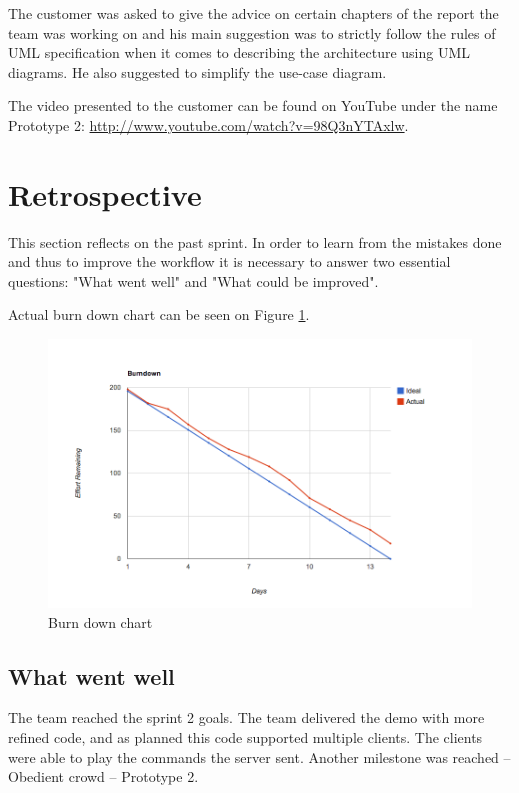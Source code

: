 The customer was asked to give the advice on certain chapters of the report the team was working on and his main suggestion was to strictly follow the rules of UML specification when it comes to describing the architecture using UML diagrams. He also suggested to simplify the use-case diagram.

The video presented to the customer can be found on YouTube under the name Prototype 2: \url{http://www.youtube.com/watch?v=98Q3nYTAxlw}.




\section{Retrospective}
This section reflects on the past sprint. In order to learn from the mistakes done and thus to improve the workflow it is necessary to answer two essential questions: "What went well" and "What could be improved".

Actual burn down chart can be seen on Figure \ref{fig:Burn2}.  

\begin{figure}[h]
	\centering
		\includegraphics[width=18cm]{sprint2/BurndownSprint2.png}
	\caption{Burn down chart}
	\label{fig:Burn2}
\end{figure}


\subsection{What went well}
The team reached the sprint 2 goals. 
The team delivered the demo with more refined code, and as planned this code supported multiple clients. 
The clients were able to play the commands the server sent.
Another milestone was reached -- Obedient crowd -- Prototype 2.

